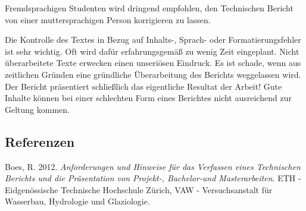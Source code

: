 \documentclass[
  letterpaper,
  DIV=11]{scrartcl}
\newlength{\cslhangindent}
\newenvironment{CSLReferences}[2] %
 {\begin{list}{}{%
  \setlength{\itemindent}{0pt}
  \setlength{\leftmargin}{0pt}
  \setlength{\parsep}{0pt}
  \ifodd #1
   \setlength{\leftmargin}{\cslhangindent}
   \setlength{\itemindent}{-1\cslhangindent}
  \fi
  \setlength{\itemsep}{#2\baselineskip}}}
 {\end{list}}
\begin{document}
Fremdsprachigen Studenten wird dringend empfohlen, den Technischen
Bericht von einer muttersprachigen Person korrigieren zu lassen.

Die Kontrolle des Textes in Bezug auf Inhalts-, Sprach- oder
Formatierungsfehler ist sehr wichtig. Oft wird dafür erfahrungsgemäß zu
wenig Zeit eingeplant. Nicht überarbeitete Texte erwecken einen
unseriösen Eindruck. Es ist schade, wenn aus zeitlichen Gründen eine
gründliche Überarbeitung des Berichts weggelassen wird. Der Bericht
präsentiert schließlich das eigentliche Resultat der Arbeit! Gute
Inhalte können bei einer schlechten Form eines Berichtes nicht
ausreichend zur Geltung kommen.

\subsection*{Referenzen}\label{referenzen}

\label{refs}
\begin{CSLReferences}{1}{0}
Boes, R. 2012. \emph{Anforderungen und {H}inweise für das {V}erfassen
eines {T}echnischen {B}erichts und die {P}räsentation von {P}rojekt-,
{B}achelor-und {M}asterarbeiten}. ETH - Eidgenössische Technische
Hochschule Zürich, VAW - Versuchsanstalt für Wasserbau, Hydrologie und
Glaziologie.

\end{CSLReferences}
\end{document}
